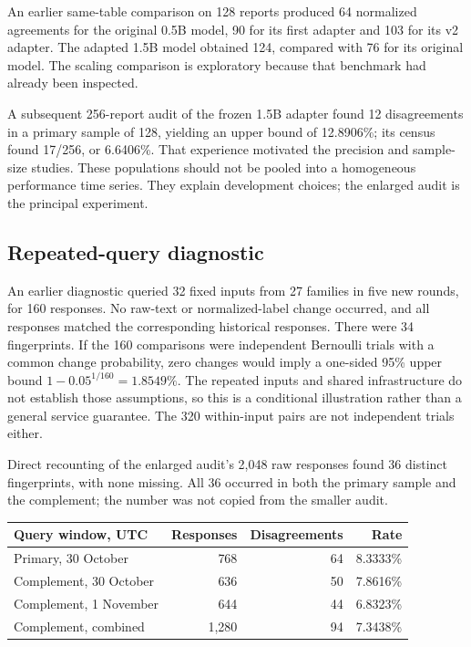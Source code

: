 \documentclass[
  10pt,
]{article}
\begin{document}
An earlier same-table comparison on 128 reports produced 64 normalized
agreements for the original 0.5B model, 90 for its first adapter and 103
for its v2 adapter. The adapted 1.5B model obtained 124, compared with
76 for its original model. The scaling comparison is exploratory because
that benchmark had already been inspected.

A subsequent 256-report audit of the frozen 1.5B adapter found 12
disagreements in a primary sample of 128, yielding an upper bound of
12.8906\%; its census found 17/256, or 6.6406\%. That experience
motivated the precision and sample-size studies. These populations
should not be pooled into a homogeneous performance time series. They
explain development choices; the enlarged audit is the principal
experiment.

\hypertarget{repeated-query-diagnostic}{%
\subsection{Repeated-query diagnostic}\label{repeated-query-diagnostic}}

An earlier diagnostic queried 32 fixed inputs from 27 families in five
new rounds, for 160 responses. No raw-text or normalized-label change
occurred, and all responses matched the corresponding historical
responses. There were 34 fingerprints. If the 160 comparisons were
independent Bernoulli trials with a common change probability, zero
changes would imply a one-sided 95\% upper bound
\(1-0.05^{1/160}=1.8549\%\). The repeated inputs and shared
infrastructure do not establish those assumptions, so this is a
conditional illustration rather than a general service guarantee. The
320 within-input pairs are not independent trials either.

Direct recounting of the enlarged audit's 2,048 raw responses found 36
distinct fingerprints, with none missing. All 36 occurred in both the
primary sample and the complement; the number was not copied from the
smaller audit.

\begin{longtable}[]{@{}lrrr@{}}
\toprule\noalign{}
Query window, UTC & Responses & Disagreements & Rate \\
\midrule\noalign{}
\endhead
\bottomrule\noalign{}
\endlastfoot
Primary, 30 October & 768 & 64 & 8.3333\% \\
Complement, 30 October & 636 & 50 & 7.8616\% \\
Complement, 1 November & 644 & 44 & 6.8323\% \\
Complement, combined & 1,280 & 94 & 7.3438\% \\
\end{longtable}
\end{document}
